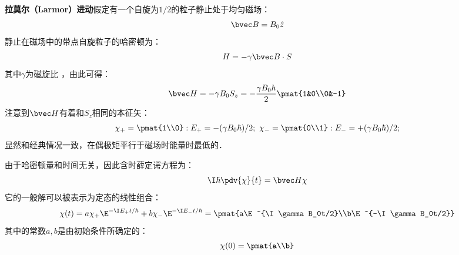 
\textbf{拉莫尔（Larmor）进动}假定有一个自旋为$1/2$的粒子静止处于均匀磁场：
\begin{equation}
\bvec B =B_0\hat{z}
\end{equation}
静止在磁场中的带点自旋粒子的哈密顿为：
\begin{equation}
H = -\gamma\bvec B\cdot S
\end{equation}
其中$\gamma$为磁旋比 ，由此可得：
\begin{equation}
\bvec H = -\gamma B_0S_z=-\frac{\gamma B_0\hbar}{2}\pmat{1&0\\0&-1}
\end{equation}
注意到$\bvec H$有着和$S_z$相同的本征矢：
\begin{equation}
\chi_+ = \pmat{1\\0}:E_+=-(\gamma B_0\hbar)/2; \ \chi_- = \pmat{0\\1}:E_-=+(\gamma B_0\hbar)/2; 
\end{equation}
显然和经典情况一致，在偶极矩平行于磁场时能量时最低的．

由于哈密顿量和时间无关，因此含时薛定谔方程为：
\begin{equation}
\I \hbar \pdv{\chi}{t}=\bvec H\chi
\end{equation}
它的一般解可以被表示为定态的线性组合：
\begin{equation}
\chi(t)=a\chi_+\E^{-\I E_+t/\hbar}+b\chi_-\E^{-\I E_-t/\hbar}=\pmat{a\E^{\I \gamma B_0t/2}\\b\E^{-\I \gamma B_0t/2}}
\end{equation}
其中的常数$a,b$是由初始条件所确定的：
\begin{equation}
\chi(0)=\pmat{a\\b}
\end{equation}
